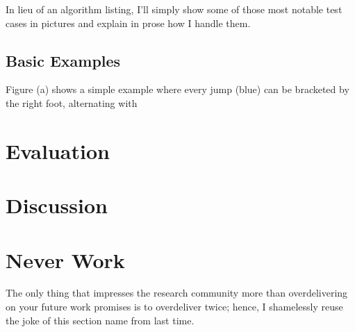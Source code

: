 \documentclass[10pt]{sigplanconf}
\begin{document}
In lieu of an algorithm listing, I'll simply show some of those most notable test cases in pictures and explain in prose how I handle them.


\subsection{Basic Examples}

Figure (a) shows a simple example where every jump (blue)
can be bracketed by the right foot,
alternating with 


\section{Evaluation}



\section{Discussion}







\section{Never Work}

The only thing that impresses the research community more than overdelivering on your future work promises
is to overdeliver twice; hence, I shamelessly reuse the joke of this section name from last time.
\end{document}
